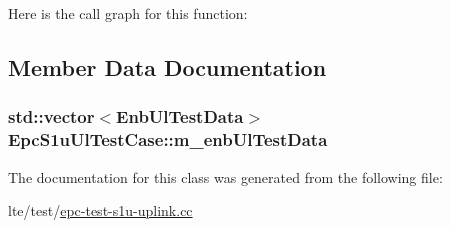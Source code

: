 Here is the call graph for this function\+:




\subsection{Member Data Documentation}
\subsubsection[{\texorpdfstring{m\+\_\+enb\+Ul\+Test\+Data}{m_enbUlTestData}}]{\setlength{\rightskip}{0pt plus 5cm}std\+::vector$<${\bf Enb\+Ul\+Test\+Data}$>$ Epc\+S1u\+Ul\+Test\+Case\+::m\+\_\+enb\+Ul\+Test\+Data\hspace{0.3cm}{\ttfamily [private]}}\hypertarget{classEpcS1uUlTestCase_a2d52c6d9f4ee886f2060016760d7bf4d}{}\label{classEpcS1uUlTestCase_a2d52c6d9f4ee886f2060016760d7bf4d}


The documentation for this class was generated from the following file\+:\begin{DoxyCompactItemize}
\item 
lte/test/\hyperlink{epc-test-s1u-uplink_8cc}{epc-\/test-\/s1u-\/uplink.\+cc}\end{DoxyCompactItemize}
